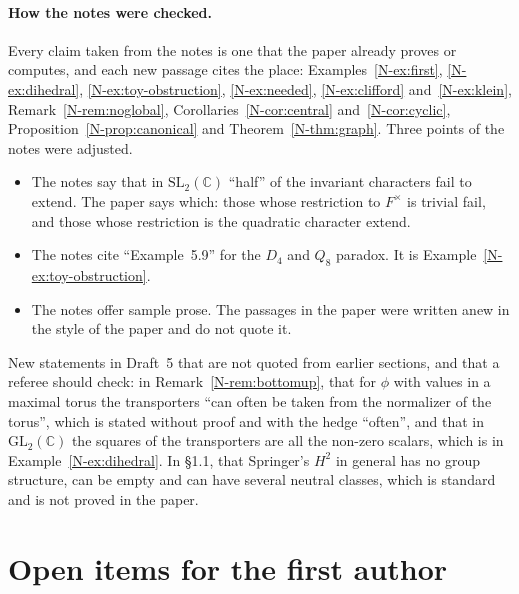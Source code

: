 \documentclass[12pt,letterpaper]{article}
\begin{document}
\paragraph{How the notes were checked.} Every claim taken from the notes
is one that the paper already proves or computes, and each new passage
cites the place: Examples~\ref{N-ex:first}, \ref{N-ex:dihedral},
\ref{N-ex:toy-obstruction}, \ref{N-ex:needed}, \ref{N-ex:clifford}
and~\ref{N-ex:klein}, Remark~\ref{N-rem:noglobal},
Corollaries~\ref{N-cor:central} and~\ref{N-cor:cyclic},
Proposition~\ref{N-prop:canonical} and Theorem~\ref{N-thm:graph}. Three
points of the notes were adjusted.
\begin{itemize}[itemsep=1pt]
\item The notes say that in $\mathrm{SL}_2(\mathbb{C})$ ``half'' of the
  invariant characters fail to extend. The paper says which: those whose
  restriction to $F^\times$ is trivial fail, and those whose restriction
  is the quadratic character extend.
\item The notes cite ``Example~5.9'' for the $D_4$ and $Q_8$ paradox.
  It is Example~\ref{N-ex:toy-obstruction}.
\item The notes offer sample prose. The passages in the paper were
  written anew in the style of the paper and do not quote it.
\end{itemize}
New statements in Draft~5 that are not quoted from earlier sections, and
that a referee should check: in Remark~\ref{N-rem:bottomup}, that for
$\phi$ with values in a maximal torus the transporters ``can often be
taken from the normalizer of the torus'', which is stated without proof
and with the hedge ``often'', and that in $\mathrm{GL}_2(\mathbb{C})$ the
squares of the transporters are all the non-zero scalars, which is in
Example~\ref{N-ex:dihedral}. In \S1.1, that Springer's $H^2$ in general
has no group structure, can be empty and can have several neutral
classes, which is standard and is not proved in the paper.

\section{Open items for the first author}\label{sec:open}
\end{document}
